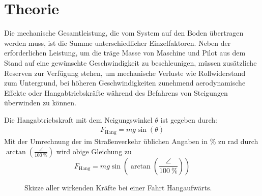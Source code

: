 \chapter{Theorie}
	Die mechanische Gesamtleistung, die vom System auf den Boden übertragen werden muss, ist die Summe unterschiedlicher Einzelfaktoren.
	Neben der erforderlichen Leistung, um die träge Masse von Maschine und Pilot aus dem Stand auf eine gewünschte Geschwindigkeit zu beschleunigen, müssen zusätzliche Reserven zur Verfügung stehen, um mechanische Verluste wie Rollwiderstand zum Untergrund, bei höheren Geschwindigkeiten zunehmend aerodynamische Effekte oder Hangabtriebskräfte während des Befahrens von Steigungen überwinden zu können.\par\medskip
	Die Hangabtriebskraft mit dem Neigungswinkel \(\theta\) ist gegeben durch:
	\begin{align}
		F_\text{Hang} = m g \sin\left(\theta\right)
		\label{eq:downhill force}
	\end{align}
	Mit der Umrechnung der im Straßenverkehr üblichen Angaben in \unit{\percent} zu \unit{\radian} durch \(\arctan\left(\frac{\angle}{\qty{100}{\percent}}\right)\) wird obige Gleichung zu
	\begin{equation}
		F_\text{Hang} = m g \sin\left(\arctan\left(\frac{\angle}{\qty{100}{\percent}}\right)\right)
		\label{eq:downhill force incline to radian}
	\end{equation}
	\begin{figure}[h]
		\centering
		
		\caption[Skizze aller wirkenden Kräfte bei einer Fahrt Hangaufwärts]{Skizze aller wirkenden Kräfte bei einer Fahrt Hangaufwärts.}%
		\label{fig:sketch torque incline}
	\end{figure}

